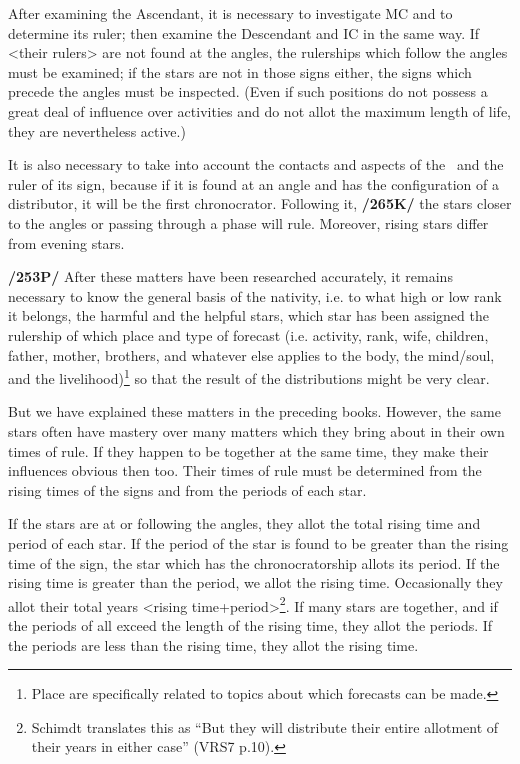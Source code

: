 After examining the Ascendant, it is necessary to investigate MC and to determine its ruler; then examine the Descendant and IC in the same way. If <their rulers> are not found at the angles, the rulerships which follow the angles must be examined; if the stars are not in those signs either, the signs which precede the angles must be inspected. (Even if such positions do not possess a great deal of influence over activities and do not allot the maximum length of life, they are nevertheless active.) 

It is also necessary to take into account the contacts and aspects of the \Moon\, and the ruler of its sign, because if it is found at an angle and has the configuration of a distributor, it will be the first chronocrator.
Following it, \textbf{/265K/} the stars closer to the angles or passing through a phase will rule. Moreover, rising stars differ from evening stars.

 
\textbf{/253P/} After  these matters have been researched accurately, it remains necessary to know the general basis of the nativity, i.e. to what high or low rank it belongs, the harmful and the helpful stars, which star has been assigned the rulership of which place and type of forecast (i.e. activity, rank, wife, children, father, mother, brothers, and whatever else applies to the body, the mind/soul, and the livelihood)\footnote{Place are specifically related to topics about which forecasts can be made.} so that the result of the distributions might be very clear.

But we have explained these matters in the preceding books. However, the same stars often have mastery over many matters which they bring about in their own times of rule. If they happen to be together at the same time, they make their influences obvious then too. Their times of rule must be determined from the rising times of the signs and from the periods of each star. 

If  the stars are at or following the angles, they allot the total rising time and period of each star. If the period of the star is found to be greater than the rising time of the sign, the star which has the chronocratorship allots its period. If the rising time
is greater than the period, we allot the rising time. Occasionally they allot their total years <rising time+period>\footnote{Schimdt translates this as ``But they will distribute their entire allotment of their years in either case'' (VRS7 p.10).}. If many stars are together, and if the periods of all exceed the length of the rising time, they allot the periods. If the periods are less than the rising time, they allot the rising time. 

